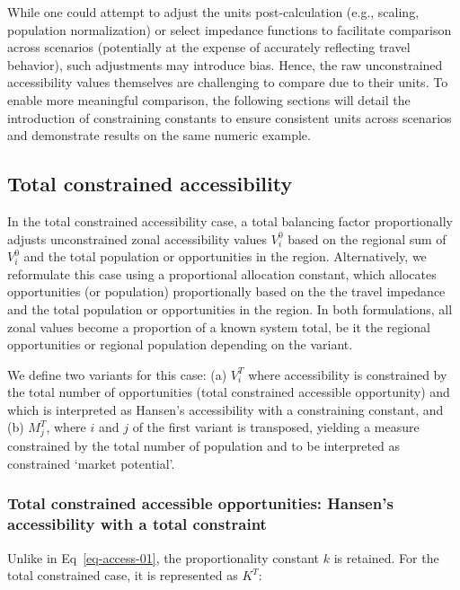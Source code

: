 \documentclass[
  10pt,
  letterpaper,
]{article}
\begin{document}
While one could attempt to adjust the units post-calculation (e.g.,
scaling, population normalization) or select impedance functions to
facilitate comparison across scenarios (potentially at the expense of
accurately reflecting travel behavior), such adjustments may introduce
bias. Hence, the raw unconstrained accessibility values themselves are
challenging to compare due to their units. To enable more meaningful
comparison, the following sections will detail the introduction of
constraining constants to ensure consistent units across scenarios and
demonstrate results on the same numeric example.

\subsection{Total constrained
accessibility}\label{total-constrained-accessibility}

In the total constrained accessibility case, a total balancing factor
proportionally adjusts unconstrained zonal accessibility values
\(V^0_i\) based on the regional sum of \(V^0_i\) and the total
population or opportunities in the region. Alternatively, we reformulate
this case using a proportional allocation constant, which allocates
opportunities (or population) proportionally based on the the travel
impedance and the total population or opportunities in the region. In
both formulations, all zonal values become a proportion of a known
system total, be it the regional opportunities or regional population
depending on the variant.

We define two variants for this case: (a) \(V_i^T\) where accessibility
is constrained by the total number of opportunities (total constrained
accessible opportunity) and which is interpreted as Hansen's
accessibility with a constraining constant, and (b) \(M_j^T\), where
\(i\) and \(j\) of the first variant is transposed, yielding a measure
constrained by the total number of population and to be interpreted as
constrained `market potential'.

\subsubsection{Total constrained accessible opportunities: Hansen's
accessibility with a total
constraint}\label{total-constrained-accessible-opportunities-hansens-accessibility-with-a-total-constraint}

Unlike in Eq~\ref{eq-access-01}, the proportionality constant \(k\) is
retained. For the total constrained case, it is represented as \(K^T\):
\end{document}
